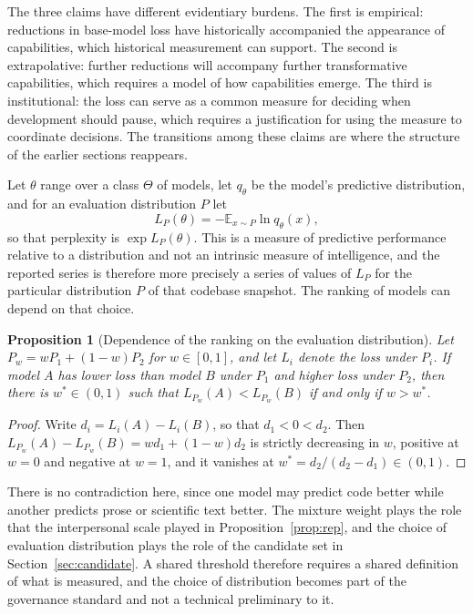 \documentclass[11pt]{article}
\newtheorem{proposition}{Proposition}
\theoremstyle{definition}
\theoremstyle{remark}
\newcommand{\E}{\mathbb{E}}
\begin{document}
The three claims have different evidentiary burdens. The first is empirical: reductions in base-model loss have historically accompanied the appearance of capabilities, which historical measurement can support. The second is extrapolative: further reductions will accompany further transformative capabilities, which requires a model of how capabilities emerge. The third is institutional: the loss can serve as a common measure for deciding when development should pause, which requires a justification for using the measure to coordinate decisions. The transitions among these claims are where the structure of the earlier sections reappears.

Let $\theta$ range over a class $\Theta$ of models, let $q_\theta$ be the model's predictive distribution, and for an evaluation distribution $P$ let
\begin{equation}
L_P(\theta)=-\E_{x\sim P}\ln q_\theta(x),
\end{equation}
so that perplexity is $\exp L_P(\theta)$. This is a measure of predictive performance relative to a distribution and not an intrinsic measure of intelligence, and the reported series is therefore more precisely a series of values of $L_{P}$ for the particular distribution $P$ of that codebase snapshot. The ranking of models can depend on that choice.

\begin{proposition}[Dependence of the ranking on the evaluation distribution]
\label{prop:distdep}
Let $P_w=wP_1+(1-w)P_2$ for $w\in[0,1]$, and let $L_i$ denote the loss under $P_i$. If model $A$ has lower loss than model $B$ under $P_1$ and higher loss under $P_2$, then there is $w^{*}\in(0,1)$ such that $L_{P_w}(A)<L_{P_w}(B)$ if and only if $w>w^{*}$.
\end{proposition}

\begin{proof}
Write $d_i=L_i(A)-L_i(B)$, so that $d_1<0<d_2$. Then $L_{P_w}(A)-L_{P_w}(B)=wd_1+(1-w)d_2$ is strictly decreasing in $w$, positive at $w=0$ and negative at $w=1$, and it vanishes at $w^{*}=d_2/(d_2-d_1)\in(0,1)$.
\end{proof}

There is no contradiction here, since one model may predict code better while another predicts prose or scientific text better. The mixture weight plays the role that the interpersonal scale played in Proposition~\ref{prop:rep}, and the choice of evaluation distribution plays the role of the candidate set in Section~\ref{sec:candidate}. A shared threshold therefore requires a shared definition of what is measured, and the choice of distribution becomes part of the governance standard and not a technical preliminary to it.
\end{document}
